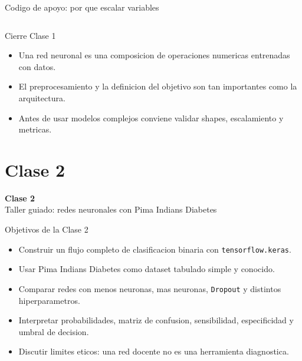 \begin{frame}[fragile]{Codigo de apoyo: por que escalar variables}
\inputminted[fontsize=\tiny]{python}{codes/feature_scaling_demo.py}
\end{frame}

\begin{frame}{Cierre Clase 1}
\begin{itemize}
    \item Una red neuronal es una composicion de operaciones numericas entrenadas con datos.
    \item El preprocesamiento y la definicion del objetivo son tan importantes como la arquitectura.
    \item Antes de usar modelos complejos conviene validar shapes, escalamiento y metricas.
\end{itemize}
\end{frame}

\section{Clase 2}

\begin{frame}[plain]
\centering
\vfill
{\Huge \bfseries Clase 2}\\[0.4cm]
{\Large Taller guiado: redes neuronales con Pima Indians Diabetes}
\vfill
\end{frame}

\begin{frame}{Objetivos de la Clase 2}
\begin{itemize}
    \item Construir un flujo completo de clasificacion binaria con \texttt{tensorflow.keras}.
    \item Usar Pima Indians Diabetes como dataset tabulado simple y conocido.
    \item Comparar redes con menos neuronas, mas neuronas, \texttt{Dropout} y distintos hiperparametros.
    \item Interpretar probabilidades, matriz de confusion, sensibilidad, especificidad y umbral de decision.
    \item Discutir limites eticos: una red docente no es una herramienta diagnostica.
\end{itemize}
\end{frame}

